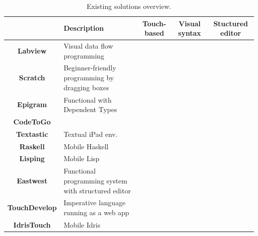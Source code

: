 
\begin{table}[ht]
{\renewcommand{\arraystretch}{2}%
\begin{tabularx}{\textwidth{}}{|c|X|c|c|c|}
\hline
	& \textbf{Description}
	& \textbf{Touch-based}                                              
	& \textbf{Visual syntax}                          
	& \textbf{Stuctured editor} 
\\ \hline		
	\textbf{Labview}      & 
		Visual data flow programming & & \cellcolor[HTML]{38761D} &
\\ \hline
	\textbf{Scratch}      & 
		Beginner-friendly programming by dragging boxes
		  & & \cellcolor[HTML]{274E13} & \cellcolor[HTML]{274E13}
\\ \hline
	\textbf{Epigram}      & 
		Functional with Dependent Types & & \cellcolor[HTML]{6AA84F} &
\\ \hline
	\textbf{CodeToGo} & & \cellcolor[HTML]{B6D7A8}{\color[HTML]{9AFF99} }                  & & \\ \cline{1-1}
	\textbf{Textastic}  & \multirow{-2}{*}{
	Textual iPad env.
	} & \multirow{-2}{*}{\cellcolor[HTML]{B6D7A8}{\color[HTML]{9AFF99} }} & \multirow{-2}{*}{}                              & \multirow{-2}{*}{}                                                   
\\ \hline
	\textbf{Raskell}      & 
		Mobile Haskell & \cellcolor[HTML]{B6D7A8}{\color[HTML]{9AFF99} } & &                                                               
\\ \hline
	\textbf{Lisping}      & 
		Mobile Lisp & \cellcolor[HTML]{6AA84F} & & \cellcolor[HTML]{B6D7A8}

\\ \hline
	\textbf{Eastwest}     & 
		Functional programming system with structured editor
		 & & & \cellcolor[HTML]{274E13}
\\ \hline	
	\textbf{TouchDevelop} & 
		Imperative language running as a web app
		 & \cellcolor[HTML]{6AA84F} & & \cellcolor[HTML]{B6D7A8} 
\\ \hline
	\textbf{IdrisTouch}   & 
		Mobile Idris      & \cellcolor[HTML]{38761D} & \cellcolor[HTML]{6AA84F}           & \cellcolor[HTML]{38761D} 
\\ \hline
\end{tabularx}
}
\caption{Existing solutions overview.}
\label{table:existing_solutions_overview}
\end{table}

